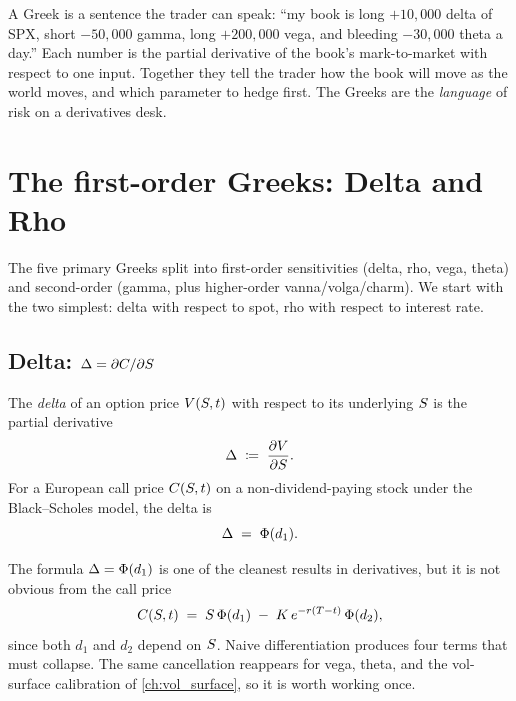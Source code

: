 \begin{intuitionbox}
A Greek is a sentence the trader can speak: ``my book is long $+10{,}000$
delta of SPX, short $-50{,}000$ gamma, long $+200{,}000$ vega, and
bleeding $-30{,}000$ theta a day.'' Each number is the partial
derivative of the book's mark-to-market with respect to one input.
Together they tell the trader how the book will move as the world
moves, and which parameter to hedge first. The Greeks are the
\emph{language} of risk on a derivatives desk.
\end{intuitionbox}

\section{The first-order Greeks: Delta and Rho}
\label{sec:ch16_first_order}

The five primary Greeks split into first-order sensitivities
(delta, rho, vega, theta) and second-order (gamma, plus
higher-order vanna/volga/charm). We start with the two simplest:
delta with respect to spot, rho with respect to interest rate.

\subsection{Delta: $\Delta = \partial C / \partial S$}
\label{subsec:ch16_delta}

\begin{definition}[Delta]
The \emph{delta} of an option price $V(S, t)$ with respect to
its underlying $S$ is the partial derivative
\begin{equation}
  \Delta \;\coloneqq\; \frac{\partial V}{\partial S}.
  \label{eq:delta_def}
\end{equation}
For a European call price $C(S, t)$ on a non-dividend-paying
stock under the Black--Scholes model, the delta is
\begin{equation}
  \Delta \;=\; \Phi(d_1).
  \label{eq:delta_call}
\end{equation}
\end{definition}

The formula $\Delta = \Phi(d_1)$ is one of the cleanest results in
derivatives, but it is not obvious from the call price
\begin{equation*}
  C(S, t) \;=\; S\,\Phi(d_1) \;-\; K\,e^{-r(T - t)}\,\Phi(d_2),
\end{equation*}
since both $d_1$ and $d_2$ depend on $S$. Naive differentiation
produces four terms that must collapse. The same cancellation
reappears for vega, theta, and the vol-surface calibration of
\cref{ch:vol_surface}, so it is worth working once.

